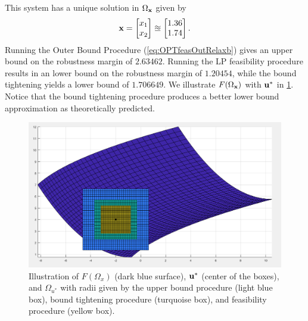%
This system has a unique solution in $\Omega_{\mathbf{x}}$ given by
\[
\mathbf{x} =
\begin{bmatrix}
x_1 \\
x_2
\end{bmatrix}
\approxeq
\begin{bmatrix}
1.36 \\
1.74
\end{bmatrix}.
\] 
Running the Outer Bound Procedure (\cref{eq:OPTfeasOutRelaxb}) gives an upper bound on the robustness margin of $2.63462$.
Running the LP feasibility procedure results in an lower bound on the robustness margin of $1.20454$, while the bound tightening yields a lower bound of $1.706649$. 
We illustrate $F(\Omega_{\mathbf{x}})$ with $\mathbf{u}^*$ in \cref{fig:FOmega}.
Notice that the bound tightening procedure produces a better lower bound approximation as theoretically predicted.

\begin{figure}[htp!]
  \begin{center}
    \includegraphics[scale=0.5425]{Figures/newex} %
  \end{center}
  \caption{\label{fig:FOmega}
    Illustration of $F(\Omega_x)$ (dark blue surface), $\mathbf{u}^*$ (center of the boxes), and $\Omega_{u^*}$  with radii given by the upper bound procedure (light blue box), bound tightening procedure (turquoise box), and feasibility procedure (yellow box).
  }
\end{figure}

